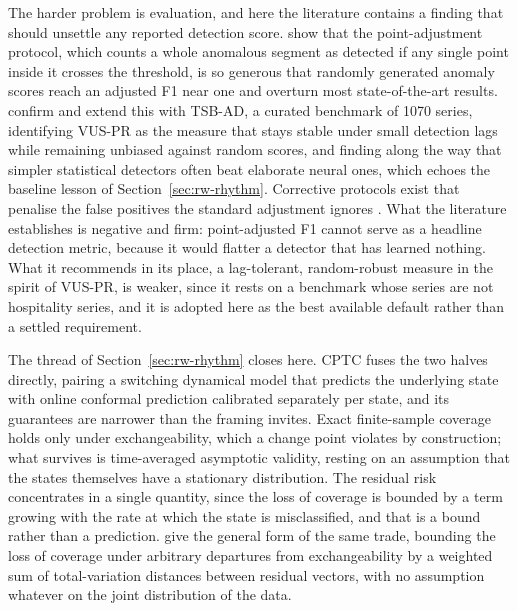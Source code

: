 The harder problem is evaluation, and here the literature contains a finding that
should unsettle any reported detection score. \citet{kim_towards_2022} show that
the point-adjustment protocol, which counts a whole anomalous segment as detected
if any single point inside it crosses the threshold, is so generous that randomly
generated anomaly scores reach an adjusted F1 near one and overturn most
state-of-the-art results. \citet{liu_elephant_2024} confirm and extend this with
TSB-AD, a curated benchmark of 1070 series, identifying VUS-PR as the measure
that stays stable under small detection lags while remaining unbiased against
random scores, and finding along the way that simpler statistical detectors often
beat elaborate neural ones, which echoes the baseline lesson of
Section~\ref{sec:rw-rhythm}. Corrective protocols exist that penalise the false
positives the standard adjustment ignores
\citep{bhattacharya_towards_2024,gim_evaluation_2023}. What the literature
establishes is negative and firm: point-adjusted F1 cannot serve as a headline
detection metric, because it would flatter a detector that has learned nothing.
What it recommends in its place, a lag-tolerant, random-robust measure in the
spirit of VUS-PR, is weaker, since it rests on a benchmark whose series are not
hospitality series, and it is adopted here as the best available default rather
than a settled requirement.

The thread of Section~\ref{sec:rw-rhythm} closes here. CPTC
\citep{sun_conformal_2025} fuses the two halves directly, pairing a switching
dynamical model that predicts the underlying state with online conformal
prediction calibrated separately per state, and its guarantees are narrower than
the framing invites. Exact finite-sample coverage holds only under
exchangeability, which a change point violates by construction; what survives is
time-averaged asymptotic validity, resting on an assumption that the states
themselves have a stationary distribution. The residual risk concentrates in a
single quantity, since the loss of coverage is bounded by a term growing with the
rate at which the state is misclassified, and that is a bound rather than a
prediction. \citet{barber_conformal_2023} give the general form of the same
trade, bounding the loss of coverage under arbitrary departures from
exchangeability by a weighted sum of total-variation distances between residual
vectors, with no assumption whatever on the joint distribution of the data.

